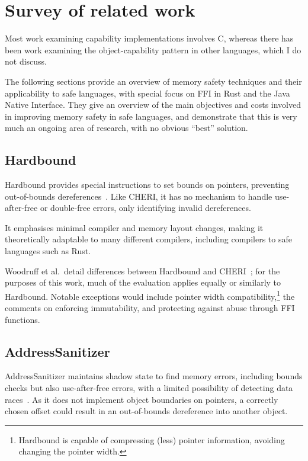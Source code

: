 \documentclass[dissertation.tex]{subfiles}
\begin{document}
\section{Survey of related work}
\label{sec:bg-related}

Most work examining capability implementations involves C, whereas there
has been work examining the object-capability pattern in other languages,
which I do not discuss.

The following sections provide an overview of memory safety techniques
and their applicability to safe languages, with special focus on FFI in
Rust and the Java Native Interface.
They give an overview of the main objectives and costs involved in
improving memory safety in safe languages, and demonstrate that this is
very much an ongoing area of research, with no obvious ``best'' solution.


\subsection{Hardbound}
\label{sec:rel-hardbound}

Hardbound provides special instructions to set bounds on pointers,
preventing out-of-bounds dereferences~\cite{devietti-hardbound}.
Like CHERI, it has no mechanism to handle use-after-free or double-free
errors, only identifying invalid dereferences.

It emphasises minimal compiler and memory layout changes, making it
theoretically adaptable to many different compilers, including compilers
to safe languages such as Rust.

Woodruff et al.\ detail differences between Hardbound and
CHERI~\cite{cheri-risc-2014}; for the purposes of this work, much of the
evaluation applies equally or similarly to Hardbound.
Notable exceptions would include pointer width compatibility,\footnote{
Hardbound is capable of compressing (less) pointer information, avoiding
changing the pointer width.
} the comments on enforcing immutability, and protecting against abuse
through FFI functions.


\subsection{AddressSanitizer}
\label{sec:rel-asan}

AddressSanitizer maintains shadow state to find memory errors, including
bounds checks but also use-after-free errors, with a limited possibility
of detecting data races~\cite{serebryany-asan}.
As it does not implement object boundaries on pointers, a correctly
chosen offset could result in an out-of-bounds dereference into another
object.
\end{document}
